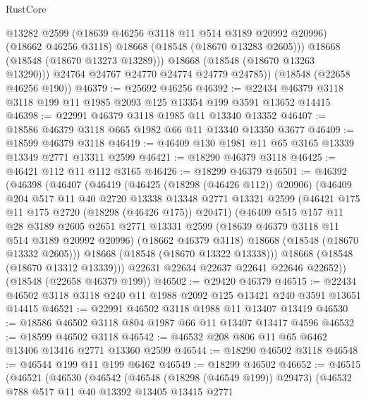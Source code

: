 \begin{lexlean}{RustCore}
\begin{coremodule}
              @13282
              @2599
              (@18639 @46256 @3118 @11 @514 @3189 @20992 @20996)
              (@18662 @46256 @3118)
              @18668
              (@18548 (@18670 @13283 @2605)))
            @18668
            (@18548 (@18670 @13273 @13289)))
          @18668
          (@18548 (@18670 @13263 @13290)))
        @24764
        @24767
        @24770
        @24774
        @24779
        @24785))
    (@18548 (@22658 @46256 @190))
@46379 := @25692 @46256
@46392 := @22434 @46379 @3118 @3118 @199 @11 @1985 @2093 @125 @13354 @199 @3591 @13652 @14415
@46398 := @22991 @46379 @3118 @1985 @11 @13340 @13352
@46407 := @18586 @46379 @3118 @665 @1982 @66 @11 @13340 @13350 @3677
@46409 := @18599 @46379 @3118
@46419 := @46409 @130 @1981 @11 @65 @3165 @13339 @13349 @2771 @13311 @2599
@46421 := @18290 @46379 @3118
@46425 := @46421 @112 @11 @112 @3165
@46426 := @18299 @46379
@46501 := @46392
    (@46398
      (@46407
        (@46419
          (@46425 (@18298 (@46426 @112)) @20906)
          (@46409
            @204
            @517
            @11
            @40
            @2720
            @13338
            @13348
            @2771
            @13321
            @2599
            (@46421 @175 @11 @175 @2720 (@18298 (@46426 @175)) @20471)
            (@46409
              @515
              @157
              @11
              @28
              @3189
              @2605
              @2651
              @2771
              @13331
              @2599
              (@18639 @46379 @3118 @11 @514 @3189 @20992 @20996)
              (@18662 @46379 @3118)
              @18668
              (@18548 (@18670 @13332 @2605)))
            @18668
            (@18548 (@18670 @13322 @13338)))
          @18668
          (@18548 (@18670 @13312 @13339)))
        @22631
        @22634
        @22637
        @22641
        @22646
        @22652))
    (@18548 (@22658 @46379 @199))
@46502 := @29420 @46379
@46515 := @22434 @46502 @3118 @3118 @240 @11 @1988 @2092 @125 @13421 @240 @3591 @13651 @14415
@46521 := @22991 @46502 @3118 @1988 @11 @13407 @13419
@46530 := @18586 @46502 @3118 @804 @1987 @66 @11 @13407 @13417 @4596
@46532 := @18599 @46502 @3118
@46542 := @46532 @208 @806 @11 @65 @6462 @13406 @13416 @2771 @13360 @2599
@46544 := @18290 @46502 @3118
@46548 := @46544 @199 @11 @199 @6462
@46549 := @18299 @46502
@46652 := @46515
    (@46521
      (@46530
        (@46542
          (@46548 (@18298 (@46549 @199)) @29473)
          (@46532
            @788
            @517
            @11
            @40
            @13392
            @13405
            @13415
            @2771

\end{coremodule}
\end{lexlean}

